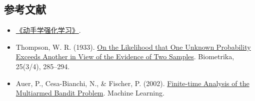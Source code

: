 \FloatBarrier
{}
\hypertarget{ux53c2ux8003ux6587ux732e-42}{%
\subsection{参考文献}\label{ux53c2ux8003ux6587ux732e-42}}

\vspace{0.25em}
\begin{itemize}
\tightlist
\item
  \href{https://hrl.boyuai.com/}{《动手学强化学习》}.
\item
  Thompson, W. R. (1933). \href{https://doi.org/10.1093/biomet/25.3-4.285}{On the Likelihood that One Unknown Probability Exceeds Another in View of the Evidence of Two Samples}. Biometrika, 25(3/4), 285--294.
\item
  Auer, P., Cesa-Bianchi, N., \& Fischer, P. (2002). \href{https://link.springer.com/article/10.1023/A:1013689704352}{Finite-time Analysis of the Multiarmed Bandit Problem}. Machine Learning.
\end{itemize}

\clearpage
